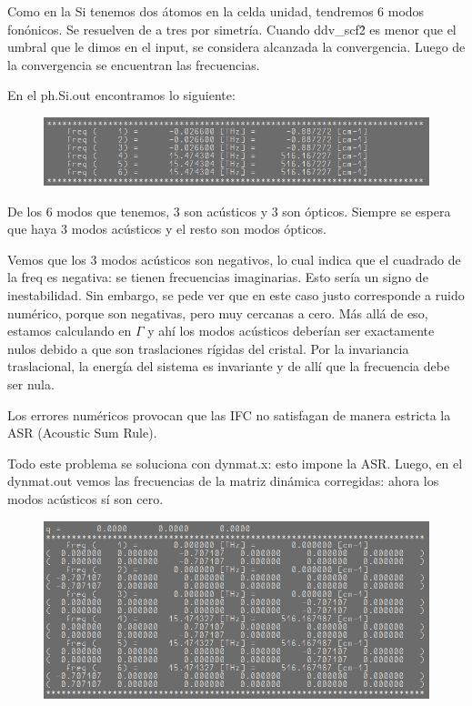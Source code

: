   Como en la Si tenemos dos átomos en la celda unidad, tendremos 6 modos fonónicos. Se resuelven de a tres por simetría. Cuando ddv\_scf\^2 es menor que el umbral que le dimos en el input, se considera alcanzada la convergencia. Luego de la convergencia se encuentran las frecuencias.

  En el ph.Si.out encontramos lo siguiente:
  \begin{figure}[H]
    \centering
    \includegraphics[scale = 0.6]{figs/D5/Si_ph.png}
  \end{figure}

  De los 6 modos que tenemos, 3 son acústicos y 3 son ópticos. Siempre se espera que haya 3 modos acústicos y el resto son modos ópticos.

  Vemos que los 3 modos acústicos son negativos, lo cual indica que el cuadrado de la freq es negativa: se tienen frecuencias imaginarias. Esto sería un signo de inestabilidad. Sin embargo, se pede ver que en este caso justo corresponde a ruido numérico, porque son negativas, pero muy cercanas a cero. Más allá de eso, estamos calculando en $\Gamma$ y ahí los modos acústicos deberían ser exactamente nulos debido a que son traslaciones rígidas del cristal. Por la invariancia traslacional, la energía del sistema es invariante y de allí que la frecuencia debe ser nula.

  Los errores numéricos provocan que las IFC no satisfagan de manera estricta la ASR (Acoustic Sum Rule).

  Todo este problema se soluciona con dynmat.x: esto impone la ASR. Luego, en el dynmat.out vemos las frecuencias de la matriz dinámica corregidas: ahora los modos acústicos sí son cero.

  \begin{figure}[H]
    \centering
    \includegraphics[scale = 0.6]{figs/D5/ASR.png}
  \end{figure}

